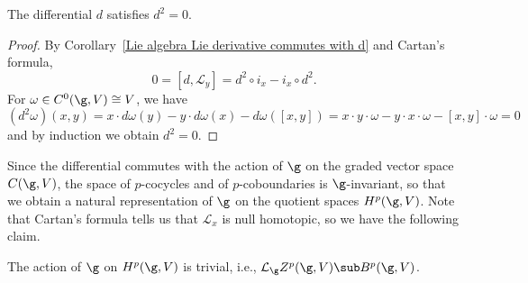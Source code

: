 \begin{proposition}
The differential $d$ satisfies $d^2=0$.
\end{proposition}
\begin{proof}
By Corollary~\ref{Lie algebra Lie derivative commutes with d} and Cartan's formula,
\[0=[d,\mathcal{L}_y]=d^2\circ i_x-i_x\circ d^2.\]
For $\omega\in C^0(\g,V)\cong V$, we have
\[(d^2\omega)(x,y)=x\cdot d\omega(y)-y\cdot d\omega(x)-d\omega([x,y])=x\cdot y\cdot\omega-y\cdot x\cdot\omega-[x,y]\cdot\omega=0\]
and by induction we obtain $d^2=0$.
\end{proof}
Since the differential commutes with the action of $\g$ on the graded vector space $C(\g,V)$, the space of $p$-cocycles and of $p$-coboundaries is $\g$-invariant, so that we obtain a natural representation of $\g$ on the quotient spaces $H^p(\g,V)$. Note that Cartan's formula tells us that $\mathcal{L}_x$ is null homotopic, so we have the following claim.
\begin{proposition}
The action of $\g$ on $H^p(\g,V)$ is trivial, i.e., $\mathcal{L}_\g Z^p(\g,V)\sub B^p(\g,V)$.
\end{proposition}
